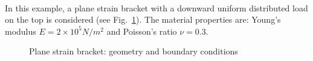 \paragraph{}
In this example, a plane strain bracket with a downward uniform distributed load on the top is considered (see Fig.~\ref{adp_fig:ex_bracket_geo_bc}).
The material properties are: Young’s modulus $E = 2\times 10^5 N/m^2$ and Poisson’s ratio $\nu = 0.3$.
    \begin{figure}[H]
        \centering
        \begin{subfigure}[b]{1\linewidth}
            \centering
        \end{subfigure}
        \begin{subfigure}[b]{1\linewidth}
            \centering
        \end{subfigure}
        \caption{ Plane strain bracket: geometry and boundary conditions}
        \label{adp_fig:ex_bracket_geo_bc}
    \end{figure}

